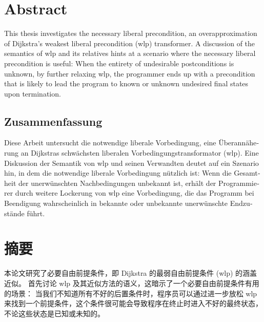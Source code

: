 \begingroup
\let\clearpage\relax
\let\cleardoublepage\relax
\let\cleardoublepage\relax

\chapter*{Abstract}
This thesis investigates the necessary liberal precondition, an overapproximation of Dijkstra's weakest liberal precondition (wlp) transformer. 
A discussion of the semantics of wlp and its relatives hints at a scenario where the necessary liberal precondition is useful: 
When the entirety of undesirable postconditions is unknown, by further relaxing wlp, the programmer ends up with a precondition that is likely to lead the program to known or unknown undesired final states upon termination. 

\vfill

\begin{otherlanguage}{ngerman}
\chapter*{Zusammenfassung}
Diese Arbeit untersucht die notwendige liberale Vorbedingung, eine Überannäherung an Dijkstras schwächsten liberalen Vorbedingungstransformator (wlp).
Eine Diskussion der Semantik von wlp und seinen Verwandten deutet auf ein Szenario hin, in dem die notwendige liberale Vorbedingung nützlich ist:
Wenn die Gesamtheit der unerwünschten Nachbedingungen unbekannt ist, erhält der Programmierer durch weitere Lockerung von wlp eine Vorbedingung, die das Programm bei Beendigung wahrscheinlich in bekannte oder unbekannte unerwünschte Endzustände führt.
\end{otherlanguage}

\vfill


\chapter*{摘要}
本论文研究了必要自由前提条件，即 Dijkstra 的最弱自由前提条件 (wlp) 的涵盖近似。
首先讨论 wlp 及其近似方法的语义，这暗示了一个必要自由前提条件有用的场景：
当我们不知道所有不好的后置条件时，程序员可以通过进一步放松 wlp来找到一个前提条件，这个条件很可能会导致程序在终止时进入不好的最终状态，不论这些状态是已知或未知的。


\vfill

\endgroup